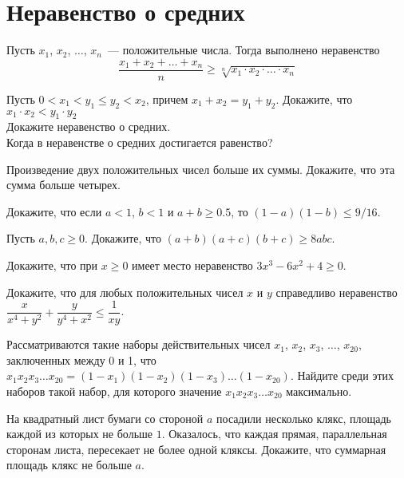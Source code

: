 

\section*{Неравенство о средних}



Пусть $x_1$, $x_2$, $\ldots$, $x_n$~--- положительные числа.
Тогда выполнено неравенство
\[
    \frac{x_1 + x_2 + \ldots + x_n}{n}
\geq
    \sqrt[n]{x_1 \cdot x_2 \cdot \ldots \cdot x_n}
\]

\begin{problems}

\item
\sbp
Пусть $0 < x_1 < y_1 \leq y_2 < x_2$, причем $x_1 + x_2 = y_1 + y_2$.
Докажите, что $x_1 \cdot x_2 < y_1 \cdot y_2$
\\
\sbp
Докажите неравенство о средних.
\\
\sbp
Когда в неравенстве о средних достигается равенство?

\item
Произведение двух положительных чисел больше их суммы.
Докажите, что эта сумма больше четырех.

\item
Докажите, что если $a < 1$, $b < 1$ и $a + b \geq 0.5$, то
$(1 - a) (1 - b) \leq 9/16$.

\item
Пусть $a, b, c \geq 0$.
Докажите, что $(a + b) (a + c) (b + c) \geq 8 a b c$.

\item
Докажите, что при $x \geq 0$ имеет место неравенство
$3 x^3 - 6 x^2 + 4 \geq 0$.

\item
Докажите, что для любых положительных чисел $x$ и $y$ справедливо неравенство
\(
    \dfrac{x}{x^4 + y^2} + \dfrac{y}{y^4 + x^2}
\leq
    \dfrac{1}{x y}
\).

\item
Рассматриваются такие наборы действительных чисел
$x_1$, $x_2$, $x_3$, $\ldots$, $x_{20}$, заключенных между 0 и 1, что
\(
    x_1 x_2 x_3 \ldots x_{20}
=
    (1 - x_1) (1 - x_2) (1 - x_3) \ldots (1 - x_{20})
\).
Найдите среди этих наборов такой набор, для которого значение
$x_1 x_2 x_3 \ldots x_{20}$ максимально.

\item
На квадратный лист бумаги со стороной $a$ посадили несколько клякс, площадь
каждой из которых не больше $1$.
Оказалось, что каждая прямая, параллельная сторонам листа, пересекает не более
одной кляксы.
Докажите, что суммарная площадь клякс не больше $a$.

\end{problems}

